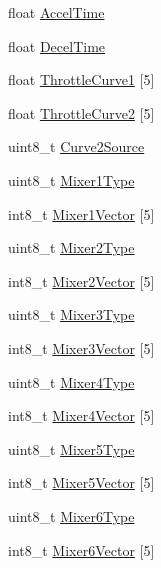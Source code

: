 \begin{DoxyCompactItemize}
\item 
float \hyperlink{struct____attribute_____a41ecce3b33affcaddc61a8f1f5eb7333}{\-Accel\-Time}
\item 
float \hyperlink{struct____attribute_____a8f2efafb7230853a9e75635931e1505d}{\-Decel\-Time}
\item 
float \hyperlink{struct____attribute_____a7f91d63c4c8032255a3484b028034ca9}{\-Throttle\-Curve1} \mbox{[}5\mbox{]}
\item 
float \hyperlink{struct____attribute_____afae1724abb34e678d7edb4909713fbd0}{\-Throttle\-Curve2} \mbox{[}5\mbox{]}
\item 
uint8\-\_\-t \hyperlink{struct____attribute_____a88e122b4ddb13657298d99333afa69cd}{\-Curve2\-Source}
\item 
uint8\-\_\-t \hyperlink{struct____attribute_____aeaa8cea3f5b7375c8ae9d1093bf6f138}{\-Mixer1\-Type}
\item 
int8\-\_\-t \hyperlink{struct____attribute_____a724b94fced06e6759a7b1a8feb47d7a5}{\-Mixer1\-Vector} \mbox{[}5\mbox{]}
\item 
uint8\-\_\-t \hyperlink{struct____attribute_____a068c33552d2c65d8c052528c3384c6a9}{\-Mixer2\-Type}
\item 
int8\-\_\-t \hyperlink{struct____attribute_____a5f5b7be71f59053e9801f555be1b01a5}{\-Mixer2\-Vector} \mbox{[}5\mbox{]}
\item 
uint8\-\_\-t \hyperlink{struct____attribute_____a3519d7a574b1601b5d895c2e78705acf}{\-Mixer3\-Type}
\item 
int8\-\_\-t \hyperlink{struct____attribute_____ae5b52b10cc7eac03d87d66b30e4eed28}{\-Mixer3\-Vector} \mbox{[}5\mbox{]}
\item 
uint8\-\_\-t \hyperlink{struct____attribute_____a8361e3ee32a2e8bf03551db63c9b548a}{\-Mixer4\-Type}
\item 
int8\-\_\-t \hyperlink{struct____attribute_____a7c34f29b09865a42e02c21177bf98b3f}{\-Mixer4\-Vector} \mbox{[}5\mbox{]}
\item 
uint8\-\_\-t \hyperlink{struct____attribute_____a2fee87d5a2d5dfc03673d0a5322898e9}{\-Mixer5\-Type}
\item 
int8\-\_\-t \hyperlink{struct____attribute_____a035273308b96d8a8dc419cbaa2982a4e}{\-Mixer5\-Vector} \mbox{[}5\mbox{]}
\item 
uint8\-\_\-t \hyperlink{struct____attribute_____aedbde5b3db63a0f4317e6e28ef54fc53}{\-Mixer6\-Type}
\item 
int8\-\_\-t \hyperlink{struct____attribute_____aedf2ecbcb1e92a554ea36b25f7ccdfa0}{\-Mixer6\-Vector} \mbox{[}5\mbox{]}

\end{DoxyCompactItemize}
